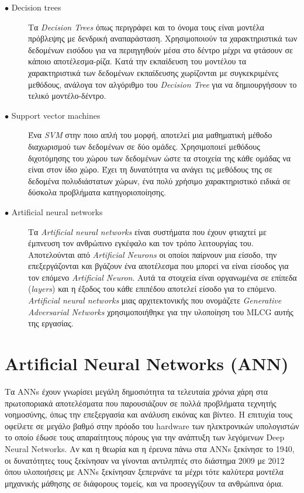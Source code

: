 \begin{description}

\item[$\bullet$ Decision trees] Τα \textit{Decision Trees} όπως περιγράφει και το όνομα τους είναι μοντέλα πρόβλεψης με δενδρική αναπαράσταση. Χρησιμοποιούν τα χαρακτηριστικά των δεδομένων εισόδου για να περιηγηθούν μέσα στο δέντρο μέχρι να φτάσουν σε κάποιο αποτέλεσμα-ρίζα. Κατά την εκπαίδευση του μοντέλου τα χαρακτηριστικά των δεδομένων εκπαίδευσης χωρίζονται με συγκεκριμένες μεθόδους, ανάλογα τον αλγόριθμο του \textit{Decision Tree} για να δημιουργήσουν το τελικό μοντέλο-δέντρο.

\item[$\bullet$ Support vector machines] Ένα \textit{SVM} στην ποιο απλή του μορφή, αποτελεί μια μαθηματική μέθοδο διαχωρισμού των δεδομένων σε δύο ομάδες. Χρησιμοποιεί μεθόδους διχοτόμησης του χώρου των δεδομένων ώστε τα στοιχεία της κάθε ομάδας να είναι στον ίδιο χώρο. Έχει τη δυνατότητα να ανάγει τις μεθόδους της σε δεδομένα πολυδιάστατων χώρων, ένα πολύ χρήσιμο χαρακτηριστικό ειδικά σε δύσκολα προβλήματα κατηγοριοποίησης. 

\item[$\bullet$ Artificial neural networks] Τα \textit{Artificial neural networks} είναι συστήματα που έχουν φτιαχτεί με έμπνευση τον ανθρώπινο εγκέφαλο και τον τρόπο λειτουργίας του. Αποτελούνται από \textit{Artificial Neurons} οι οποίοι παίρνουν μια είσοδο, την επεξεργάζονται και βγάζουν ένα αποτέλεσμα που μπορεί να είναι είσοδος για τον επόμενο \textit{Artificial Neuron}. Αυτά τα στοιχεία είναι οργανωμένα σε επίπεδα (\textit{layers}) και η έξοδος του κάθε επιπέδου αποτελεί είσοδο για το επόμενο. \textit{Artificial neural networks} μιας αρχιτεκτονικής που ονομάζετε \textit{Generative Adversarial Networks} χρησιμοποιήθηκε για την υλοποίηση του MLCG αυτής της εργασίας.

\end{description}



\section{Artificial Neural Networks (ANN)}
Τα ANNs έχουν γνωρίσει μεγάλη δημοσιότητα τα τελευταία χρόνια χάρη στα πρωτοποριακά αποτελέσματα που παρουσιάζουν σε πολλά προβλήματα τεχνητής νοημοσύνης, όπως την επεξεργασία και ανάλυση εικόνας και βίντεο. Η επιτυχία τους οφείλετε σε μεγάλο βαθμό στην πρόοδο του hardware των ηλεκτρονικών υπολογιστών το οποίο έδωσε τους απαραίτητους πόρους για την ανάπτυξη των λεγόμενων Deep Neural Networks. Αν και η θεωρία και η έρευνα πάνω στα ANNs ξεκίνησε το 1940, οι δυνατότητες τους ξεκίνησαν να γίνονται αντιληπτές στο διάστημα 2009 με 2012 όπου υλοποιήσεις με ANNs ξεκίνησαν ξεπερνάνε τα μέχρι τότε καλύτερα μοντέλα μηχανικής μάθησης σε διάφορους τομείς, και να προσεγγίζουν τα ανθρώπινα όρια.

